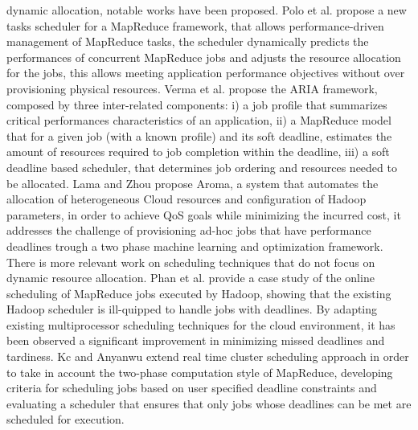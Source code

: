 dynamic allocation, notable works have been proposed. Polo et al. \cite{Polo2010} propose a new tasks scheduler for a MapReduce framework, that allows performance-driven management of MapReduce tasks, the scheduler dynamically predicts the performances of concurrent MapReduce jobs and adjusts the resource allocation for the jobs, this allows meeting application performance objectives without over provisioning physical resources. Verma et al. \cite{Verma2012} propose the ARIA framework, composed by three inter-related components: i) a job profile that summarizes critical performances characteristics of an application, ii) a MapReduce model that for a given job (with a known profile) and its soft deadline, estimates the amount of resources required to job completion within the deadline, iii) a soft deadline based scheduler, that determines job ordering and resources needed to be allocated. Lama and Zhou \cite{Lama2012} propose Aroma, a system that automates the allocation of heterogeneous Cloud resources and configuration of Hadoop parameters, in order to achieve QoS goals while minimizing the incurred cost, it addresses the challenge of provisioning ad-hoc jobs that have performance deadlines trough a two phase machine learning and optimization framework. There is more relevant work on scheduling techniques that do not focus on dynamic resource allocation. Phan et al. \cite{Phan2011} provide a case study of the online scheduling of MapReduce jobs executed by Hadoop, showing that the existing Hadoop scheduler is ill-quipped to handle jobs with deadlines. By adapting existing multiprocessor scheduling techniques for the cloud environment, it has been observed a significant improvement in minimizing missed deadlines and tardiness. Kc and Anyanwu \cite{Kc2010} extend real time cluster scheduling approach in order to take in account the two-phase computation style of MapReduce, developing criteria for scheduling jobs based on user specified deadline constraints and evaluating a scheduler that ensures that only jobs whose deadlines can be met are scheduled for execution.
